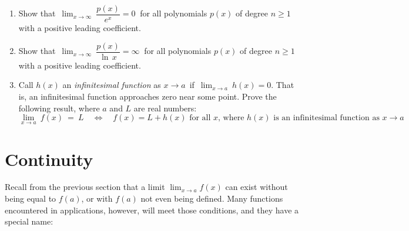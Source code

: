 {\begin{enumerate}[\bfseries 1.]
 \begin{enumerate}[\bfseries (a)]
  \item Evaluate $\displaystyle\lim_{\beta \to 1-}~\gamma~$. What is the
  physical interpretation of this limit?
  \item Suppose an astronaut and his twin just turned 30 years old when the
  astronaut leaves earth on a high-speed journey through space. Upon returning
  to earth the astronaut is 35 and his twin is 70. At roughly what fraction of
  the speed of light must the astronaut have been traveling?
 \end{enumerate}
 \item Show that $\,\displaystyle\lim_{x \to \infty} ~\dfrac{p(x)}{e^x} = 0~$
 for all polynomials $p(x)$ of degree $n \ge 1$ with a positive leading
 coefficient.
 \item Show that $\,\displaystyle\lim_{x \to \infty} ~\dfrac{p(x)}{\ln\,x} = \infty~$
 for all polynomials $p(x)$ of degree $n \ge 1$ with a positive leading
 coefficient.
 \item Call $h(x)$ an
 \emph{infinitesimal function} as
 $x \to a\,$ if $\,\displaystyle\lim_{x \to a} ~h(x) = 0$. That is, an
 infinitesimal function approaches zero near some point. Prove the following
 result, where $a$ and $L$ are real numbers:
\[
\lim_{x \to a}~f(x) ~=~ L \quad\Leftrightarrow\quad f(x) = L + h(x) \text{ for all $x$, where $h(x)$ is an
infinitesimal function as $x \to a$}
\]
\end{enumerate}}
\newpage
\section{Continuity}
Recall from the previous section that a limit $\lim_{x \to a} f(x)$ can exist
without being equal to $f(a)$, or with $f(a)$ not even being defined. Many
functions encountered in applications, however, will meet those conditions, and
they have a special name:

